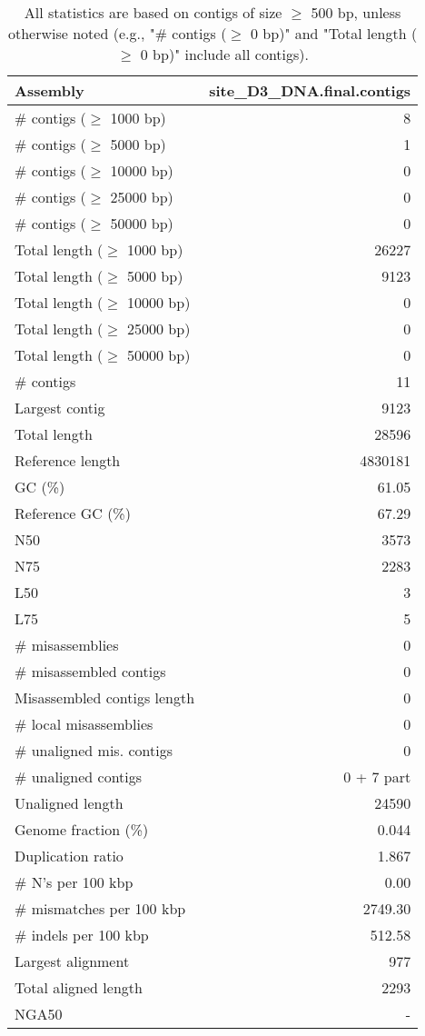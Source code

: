 \documentclass[12pt,a4paper]{article}
\begin{document}
\begin{table}[ht]
\begin{center}
\caption{All statistics are based on contigs of size $\geq$ 500 bp, unless otherwise noted (e.g., "\# contigs ($\geq$ 0 bp)" and "Total length ($\geq$ 0 bp)" include all contigs).}
\begin{tabular}{|l*{1}{|r}|}
\hline
Assembly & site\_D3\_DNA.final.contigs \\ \hline
\# contigs ($\geq$ 1000 bp) & 8 \\ \hline
\# contigs ($\geq$ 5000 bp) & 1 \\ \hline
\# contigs ($\geq$ 10000 bp) & 0 \\ \hline
\# contigs ($\geq$ 25000 bp) & 0 \\ \hline
\# contigs ($\geq$ 50000 bp) & 0 \\ \hline
Total length ($\geq$ 1000 bp) & 26227 \\ \hline
Total length ($\geq$ 5000 bp) & 9123 \\ \hline
Total length ($\geq$ 10000 bp) & 0 \\ \hline
Total length ($\geq$ 25000 bp) & 0 \\ \hline
Total length ($\geq$ 50000 bp) & 0 \\ \hline
\# contigs & 11 \\ \hline
Largest contig & 9123 \\ \hline
Total length & 28596 \\ \hline
Reference length & 4830181 \\ \hline
GC (\%) & 61.05 \\ \hline
Reference GC (\%) & 67.29 \\ \hline
N50 & 3573 \\ \hline
N75 & 2283 \\ \hline
L50 & 3 \\ \hline
L75 & 5 \\ \hline
\# misassemblies & 0 \\ \hline
\# misassembled contigs & 0 \\ \hline
Misassembled contigs length & 0 \\ \hline
\# local misassemblies & 0 \\ \hline
\# unaligned mis. contigs & 0 \\ \hline
\# unaligned contigs & 0 + 7 part \\ \hline
Unaligned length & 24590 \\ \hline
Genome fraction (\%) & 0.044 \\ \hline
Duplication ratio & 1.867 \\ \hline
\# N's per 100 kbp & 0.00 \\ \hline
\# mismatches per 100 kbp & 2749.30 \\ \hline
\# indels per 100 kbp & 512.58 \\ \hline
Largest alignment & 977 \\ \hline
Total aligned length & 2293 \\ \hline
NGA50 & - \\ \hline
\end{tabular}
\end{center}
\end{table}
\end{document}
